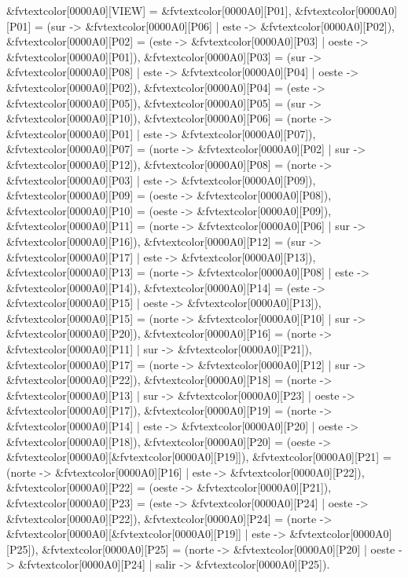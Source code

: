 \begin{Code}[commandchars=&\[\]]
&fvtextcolor[0000A0][VIEW] = &fvtextcolor[0000A0][P01],
&fvtextcolor[0000A0][P01]  = (sur   -> &fvtextcolor[0000A0][P06] | este  -> &fvtextcolor[0000A0][P02]),
&fvtextcolor[0000A0][P02]  = (este  -> &fvtextcolor[0000A0][P03] | oeste -> &fvtextcolor[0000A0][P01]),
&fvtextcolor[0000A0][P03]  = (sur   -> &fvtextcolor[0000A0][P08] | este  -> &fvtextcolor[0000A0][P04] | oeste -> &fvtextcolor[0000A0][P02]),
&fvtextcolor[0000A0][P04]  = (este  -> &fvtextcolor[0000A0][P05]),
&fvtextcolor[0000A0][P05]  = (sur   -> &fvtextcolor[0000A0][P10]),
&fvtextcolor[0000A0][P06]  = (norte -> &fvtextcolor[0000A0][P01] | este  -> &fvtextcolor[0000A0][P07]),
&fvtextcolor[0000A0][P07]  = (norte -> &fvtextcolor[0000A0][P02] | sur   -> &fvtextcolor[0000A0][P12]),
&fvtextcolor[0000A0][P08]  = (norte -> &fvtextcolor[0000A0][P03] | este  -> &fvtextcolor[0000A0][P09]),
&fvtextcolor[0000A0][P09]  = (oeste -> &fvtextcolor[0000A0][P08]),
&fvtextcolor[0000A0][P10]  = (oeste -> &fvtextcolor[0000A0][P09]),
&fvtextcolor[0000A0][P11]  = (norte -> &fvtextcolor[0000A0][P06] | sur   -> &fvtextcolor[0000A0][P16]),
&fvtextcolor[0000A0][P12]  = (sur   -> &fvtextcolor[0000A0][P17] | este  -> &fvtextcolor[0000A0][P13]),
&fvtextcolor[0000A0][P13]  = (norte -> &fvtextcolor[0000A0][P08] | este  -> &fvtextcolor[0000A0][P14]),
&fvtextcolor[0000A0][P14]  = (este  -> &fvtextcolor[0000A0][P15] | oeste -> &fvtextcolor[0000A0][P13]),
&fvtextcolor[0000A0][P15]  = (norte -> &fvtextcolor[0000A0][P10] | sur   -> &fvtextcolor[0000A0][P20]),
&fvtextcolor[0000A0][P16]  = (norte -> &fvtextcolor[0000A0][P11] | sur   -> &fvtextcolor[0000A0][P21]),
&fvtextcolor[0000A0][P17]  = (norte -> &fvtextcolor[0000A0][P12] | sur   -> &fvtextcolor[0000A0][P22]),
&fvtextcolor[0000A0][P18]  = (norte -> &fvtextcolor[0000A0][P13] | sur   -> &fvtextcolor[0000A0][P23] | oeste -> &fvtextcolor[0000A0][P17]),
&fvtextcolor[0000A0][P19]  = (norte -> &fvtextcolor[0000A0][P14] | este  -> &fvtextcolor[0000A0][P20] | oeste -> &fvtextcolor[0000A0][P18]),
&fvtextcolor[0000A0][P20]  = (oeste -> &fvtextcolor[0000A0][&fvtextcolor[0000A0][P19]]),
&fvtextcolor[0000A0][P21]  = (norte -> &fvtextcolor[0000A0][P16] | este  -> &fvtextcolor[0000A0][P22]),
&fvtextcolor[0000A0][P22]  = (oeste -> &fvtextcolor[0000A0][P21]),
&fvtextcolor[0000A0][P23]  = (este  -> &fvtextcolor[0000A0][P24] | oeste -> &fvtextcolor[0000A0][P22]),
&fvtextcolor[0000A0][P24]  = (norte -> &fvtextcolor[0000A0][&fvtextcolor[0000A0][P19]] | este  -> &fvtextcolor[0000A0][P25]),
&fvtextcolor[0000A0][P25]  = (norte -> &fvtextcolor[0000A0][P20] | oeste -> &fvtextcolor[0000A0][P24] | salir -> &fvtextcolor[0000A0][P25]).


\end{Code}
